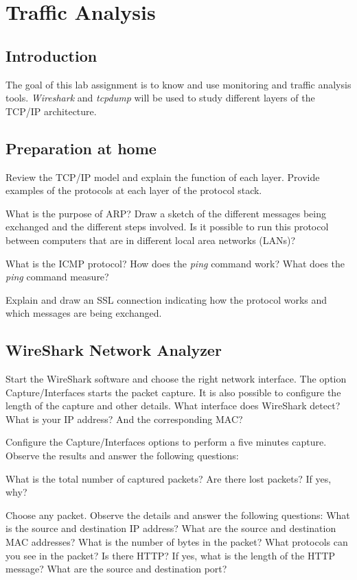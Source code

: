 \chapter{Traffic Analysis}

\section{Introduction}
The goal of this lab assignment is to know and use monitoring and traffic analysis tools.
\emph{Wireshark} and \emph{tcpdump} will be used to study different layers of the TCP/IP architecture.

\section{Preparation at home}

Review the TCP/IP model and explain the function of each layer.
Provide examples of the protocols at each layer of the protocol stack.

What is the purpose of ARP?
Draw a sketch of the different messages being exchanged and the different steps involved.
Is it possible to run this protocol between computers that are in different local area networks (LANs)?

What is the ICMP protocol?
How does the \emph{ping} command work?
What does the \emph{ping} command measure?

Explain and draw an SSL connection indicating how the protocol works and which messages are being exchanged.

\section{WireShark Network Analyzer}

Start the WireShark software and choose the right network interface.
The option Capture/Interfaces starts the packet capture.
It is also possible to configure the length of the capture and other details.
What interface does WireShark detect?
What is your IP address?
And the corresponding MAC?

Configure the Capture/Interfaces options to perform a five minutes capture.
Observe the results and answer the following questions:

What is the total number of captured packets?
Are there lost packets?
If yes, why?

Choose any packet.
Observe the details and answer the following questions:
What is the source and destination IP address?
What are the source and destination MAC addresses?
What is the number of bytes in the packet?
What protocols can you see in the packet?
Is there HTTP?
If yes, what is the length of the HTTP message?
What are the source and destination port?


